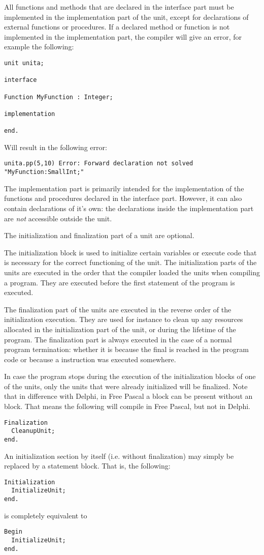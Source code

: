All functions and methods that are declared in the interface part must
be implemented in the implementation part of the unit, except for
declarations of external functions or procedures. If a declared method 
or function is not implemented in the implementation part, the compiler
will give an error, for example the following:
\begin{verbatim}
unit unita;

interface

Function MyFunction : Integer;

implementation

end.
\end{verbatim}
Will result in the following error:
\begin{verbatim}
unita.pp(5,10) Error: Forward declaration not solved "MyFunction:SmallInt;"
\end{verbatim}

The implementation part is primarily intended for the implementation of the
functions and procedures declared in the interface part. However, it can
also contain declarations of it's own: the declarations inside the 
implementation part are {\em not} accessible outside the unit. 

The initialization and finalization part of a unit are optional.

The initialization block is used to initialize certain variables or 
execute code that is necessary for the correct functioning of the unit. 
The initialization parts of the units
are executed in the order that the compiler loaded the units when compiling 
a program. They are executed before the first statement of the program is
executed.

The finalization part of the units are executed in the reverse order of the
initialization execution. They are used for instance to clean up any resources 
allocated in the initialization part  of the unit, or during the lifetime of
the program. The finalization part is always executed in the case of a
normal program termination: whether it is because the final  is
reached in the program code or because a  instruction was executed
somewhere.

In case the program stops during the execution of the initialization blocks
of one of the units, only the units that were already initialized will be
finalized.
Note that in difference with Delphi, in Free Pascal a  block can be 
present without an  block. That means the following will
compile in Free Pascal, but not in Delphi.
\begin{verbatim}
Finalization
  CleanupUnit;
end.
\end{verbatim}
An initialization section by itself (i.e. without finalization) may simply be 
replaced by a statement block. That is, the following:
\begin{verbatim}
Initialization
  InitializeUnit;
end.
\end{verbatim}
is completely equivalent to
\begin{verbatim}
Begin
  InitializeUnit;
end.
\end{verbatim}


